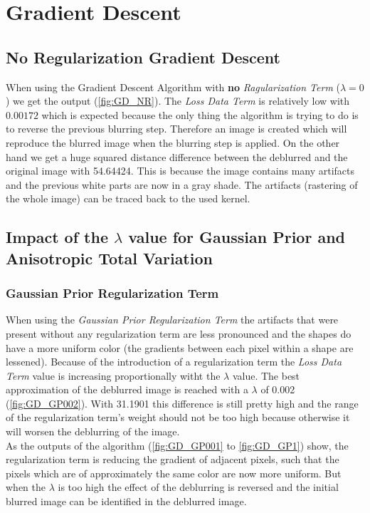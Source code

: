 \documentclass{report}
\begin{document}
	\section{Gradient Descent}
	\startsection
		\renewcommand{\thesubsection}{\thesection.\alph{subsection}}
		\subsection{No Regularization Gradient Descent}
		\startsubsection
			When using the Gradient Descent Algorithm with \textbf{no} \textit{Ragularization Term} ($\lambda = 0$) we get the output (\ref{fig:GD_NR}). The \textit{Loss Data Term} is relatively low with $0.00172$ which is expected because the only thing the algorithm is trying to do is to reverse the previous blurring step. Therefore an image is created which will reproduce the blurred image when the blurring step is applied. On the other hand we get a huge squared distance difference between the deblurred and the original image with 54.64424. This is because the image contains many artifacts and the previous white parts are now in a gray shade. The artifacts (rastering of the whole image) can be traced back to the used kernel.
		\closesection
		\subsection{Impact of the $\lambda$ value for Gaussian Prior and Anisotropic Total Variation}
		\startsubsection
			\subsubsection{Gaussian Prior Regularization Term}
			\startsubsection
				When using the \textit{Gaussian Prior Regularization Term} the artifacts that were present without any regularization term are less pronounced and the shapes do have a more uniform color (the gradients between each pixel within a shape are lessened). Because of the introduction of a regularization term the \textit{Loss Data Term} value is increasing proportionally witht the $\lambda$ value. The best approximation of the deblurred image is reached with a $\lambda$ of 0.002 (\ref{fig:GD_GP002}). With 31.1901 this difference is still pretty high and the range of the regularization term's weight should not be too high because otherwise it will worsen the deblurring of the image. \\
				As the outputs of the algorithm (\ref{fig:GD_GP001} to \ref{fig:GD_GP1}) show, the regularization term is reducing the gradient of adjacent pixels, such that the pixels which are of approximately the same color are now more uniform. But when the $\lambda$ is too high the effect of the deblurring is reversed and the initial blurred image can be identified in the deblurred image.
			\closesection
\end{document}
